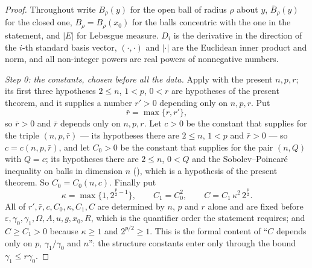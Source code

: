 \begin{proof}
Throughout write $B_\rho(y)$ for the open ball of radius $\rho$ about $y$,
$\overline B_\rho(y)$ for the closed one, $B_\rho=B_\rho(x_0)$ for the balls
concentric with the one in the statement, and $|E|$ for Lebesgue measure.  $D_i$
is the derivative in the direction of the $i$-th standard basis vector,
$(\cdot,\cdot)$ and $|\cdot|$ are the Euclidean inner product and norm, and all
non-integer powers are real powers of nonnegative numbers.

\emph{Step 0: the constants, chosen before all the data.}  Apply
 with the present $n,p,r$; its first three
hypotheses $2\le n$, $1<p$, $0<r$ are hypotheses of the present theorem, and it
supplies a number $r'>0$ depending only on $n,p,r$.  Put
\[
\bar r=\max\{r,r'\},
\]
so $\bar r>0$ and $\bar r$ depends only on $n,p,r$.  Let $c>0$ be the constant
that  supplies for the triple $(n,p,\bar r)$ ---
its hypotheses there are $2\le n$, $1<p$ and $\bar r>0$ --- so $c=c(n,p,\bar r)$,
and let $C_0>0$ be the constant that  supplies for
the pair $(n,Q)$ with $Q=c$; its hypotheses there are $2\le n$, $0<Q$ and the
Sobolev--Poincar\'e inequality on balls in dimension $n$
(), which is a hypothesis of the present
theorem.  So $C_0=C_0(n,c)$.  Finally put
\[
\kappa=\max\{1,2^{\frac p2-1}\},\qquad
C_1=C_0^2,\qquad
C=C_1\,\kappa^2\,2^{\frac p2} .
\]
All of $r',\bar r,c,C_0,\kappa,C_1,C$ are determined by $n$, $p$ and $r$ alone
and are fixed before $\varepsilon,\gamma_0,\gamma_1,\Omega,A,u,g,x_0,R$, which is
the quantifier order the statement requires; and $C\ge C_1>0$ because
$\kappa\ge1$ and $2^{p/2}\ge1$.  This is the formal content of ``$C$ depends only
on $p$, $\gamma_1/\gamma_0$ and $n$'': the structure constants enter only through
the bound $\gamma_1\le r\gamma_0$.


\end{proof}
